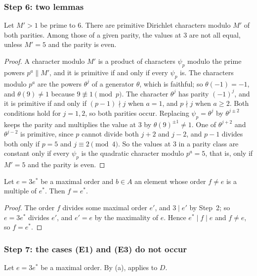 \subsubsection*{Step 6: two lemmas}

\begin{lemma}\label{lem:chars}
Let $M'>1$ be prime to $6$. There are primitive Dirichlet characters modulo
$M'$ of both parities. Among those of a given parity, the values at $3$ are
not all equal, unless $M'=5$ and the parity is even.
\end{lemma}

\begin{proof}
A character modulo $M'$ is a product of characters $\psi_{p}$ modulo the
prime powers $p^{a}\parallel M'$, and it is primitive if and only if every
$\psi_{p}$ is. The characters modulo $p^{a}$ are the powers $\theta^{j}$ of a
generator $\theta$, which is faithful; so $\theta(-1)=-1$, and
$\theta(9)\ne1$ because $9\not\equiv1\pmod p$. The character $\theta^{j}$ has
parity $(-1)^{j}$, and it is primitive if and only if $(p-1)\nmid j$ when
$a=1$, and $p\nmid j$ when $a\ge2$. Both conditions hold for $j=1,2$, so
both parities occur. Replacing $\psi_{p}=\theta^{j}$ by $\theta^{j\pm2}$ keeps
the parity and multiplies the value at $3$ by $\theta(9)^{\pm1}\ne1$. One of
$\theta^{j+2}$ and $\theta^{j-2}$ is primitive, since $p$ cannot divide both
$j+2$ and $j-2$, and $p-1$ divides both only if $p=5$ and $j\equiv2\pmod4$.
So the values at $3$ in a parity class are constant only if every
$\psi_{p}$ is the quadratic character modulo $p^{a}=5$, that is, only if
$M'=5$ and the parity is even.
\end{proof}

\begin{lemma}\label{lem:multiple}
Let $e=3e^{*}$ be a maximal order and $b\in A$ an element whose order $f\ne
e$ is a multiple of $e^{*}$. Then $f=e^{*}$.
\end{lemma}

\begin{proof}
The order $f$ divides some maximal order $e'$, and $3\mid e'$ by Step~2; so
$e=3e^{*}$ divides $e'$, and $e'=e$ by the maximality of $e$. Hence
$e^{*}\mid f\mid e$ and $f\ne e$, so $f=e^{*}$.
\end{proof}

\subsubsection*{Step 7: the cases (E1) and (E3) do not occur}
Let $e=3e^{*}$ be a maximal order. By (a), 
applies to $D$.


